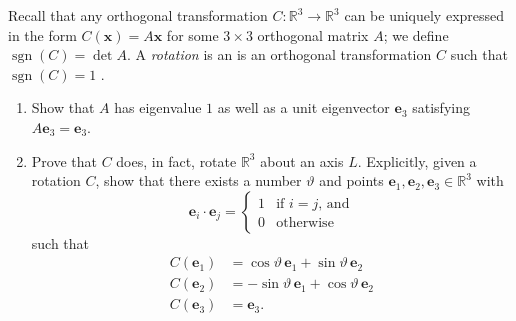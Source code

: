 \documentclass[12 pt, letterpaper]{hmcpset}
\begin{document}
\pagebreak

\begin{problem}[Problem 2.]
	Recall that any orthogonal transformation $C : \mathbb{R}^{3} \to \mathbb{R}^{3}$ can be uniquely expressed in the form $C (\mathbf{x}) = A \mathbf{x}$ for some $3 \times 3$ orthogonal matrix $A$; we define $\operatorname{sgn}(C) = \det A$. A \textit{rotation} is an is an orthogonal transformation $C$  such that $\operatorname{sgn}(C) = 1$ .
	\begin{enumerate}
		\item Show that $A$ has eigenvalue $1$ as well as a unit eigenvector $\mathbf{e}_{3}$ satisfying $A \mathbf{e}_{3} = \mathbf{e}_{3}$.
		\item Prove that $C$ does, in fact, rotate $\mathbb{R}^{3}$ about an axis $L$. Explicitly, given a rotation $C$, show that there exists a number $\vartheta$ and points $\mathbf{e}_{1}, \mathbf{e}_{2}, \mathbf{e}_{3} \in \mathbb{R}^{3}$ with
			\[
				\mathbf{e}_{i} \cdot \mathbf{e}_{j} = \begin{cases}
					1 & \text{if } i = j \text{, and} \\
					0 & \text{otherwise}
				\end{cases}
			\]
			such that
			\[
				\begin{split}
					C(\mathbf{e}_{1}) & = \cos{\vartheta} \, \mathbf{e}_{1} + \sin{\vartheta} \, \mathbf{e}_{2} \\
					C(\mathbf{e}_{2}) & = - \sin{\vartheta} \, \mathbf{e}_{1} + \cos{\vartheta} \, \mathbf{e}_{2} \\
					C(\mathbf{e}_{3}) & = \mathbf{e}_{3}.
				\end{split}
			\]
	\end{enumerate}
\end{problem}
\end{document}
